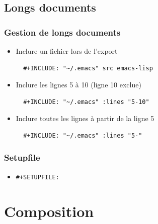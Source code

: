 \documentclass[presentation,t,hideothersubsections]{beamer}
\begin{document}
\subsection{Longs documents}
\label{sec-2-9}
\begin{frame}[fragile]
\frametitle{Gestion de longs documents}
\label{sec-2-9-1}


\begin{itemize}
\item Inclure un fichier lors de l'export


\lstset{language=org}
\begin{lstlisting}
  #+INCLUDE: "~/.emacs" src emacs-lisp
\end{lstlisting}
\item Inclure les lignes 5 à 10 (ligne 10 exclue)


\lstset{language=org}
\begin{lstlisting}
  #+INCLUDE: "~/.emacs" :lines "5-10"
\end{lstlisting}
\item Inclure toutes les lignes à partir de la ligne 5


\lstset{language=org}
\begin{lstlisting}
  #+INCLUDE: "~/.emacs" :lines "5-"
\end{lstlisting}
\end{itemize}
\end{frame}
\begin{frame}
\frametitle{Setupfile}
\label{sec-2-9-2}


\begin{itemize}
\item \texttt{\#+SETUPFILE:}
\end{itemize}
\end{frame}
\section{Composition}
\label{sec-3}
\end{document}
